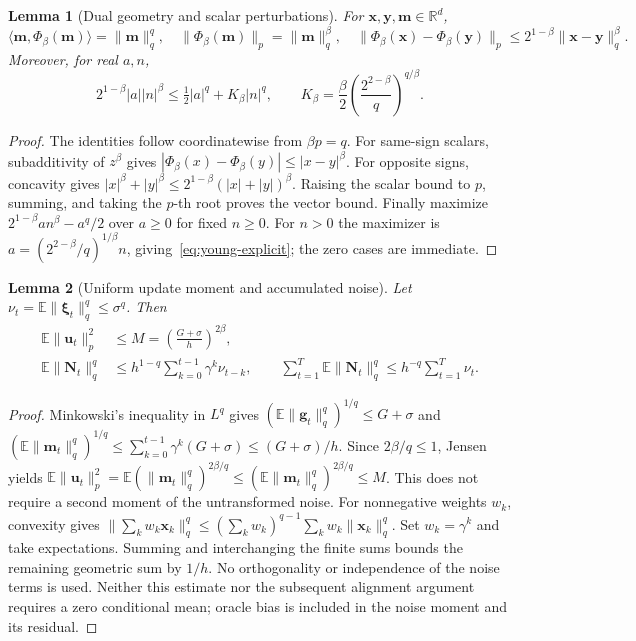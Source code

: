 \documentclass[10pt,a4paper]{amsart}
\newtheorem{lemma}{Lemma}
\begin{document}
\begin{lemma}[Dual geometry and scalar perturbations]\label{lemma:holder}
For $\mathbf{x},\mathbf{y},\mathbf{m}\in\mathbb R^d$,
\begin{equation}
\langle \mathbf{m},\Phi_\beta(\mathbf{m})\rangle=\|\mathbf{m}\|_q^q,\quad
\|\Phi_\beta(\mathbf{m})\|_p=\|\mathbf{m}\|_q^\beta,\quad
\|\Phi_\beta(\mathbf{x})-\Phi_\beta(\mathbf{y})\|_p\le2^{1-\beta}\|\mathbf{x}-\mathbf{y}\|_q^\beta.
\end{equation}
Moreover, for real $a,n$,
\begin{equation}\label{eq:young-explicit}
2^{1-\beta}|a||n|^\beta\le\tfrac12|a|^q+K_\beta|n|^q,
\qquad K_\beta=\frac\beta2\left(\frac{2^{2-\beta}}q\right)^{q/\beta}.
\end{equation}
\end{lemma}
\begin{proof}
The identities follow coordinatewise from $\beta p=q$. For same-sign scalars, subadditivity of $z^\beta$ gives $|\Phi_\beta(x)-\Phi_\beta(y)|\le|x-y|^\beta$. For opposite signs, concavity gives $|x|^\beta+|y|^\beta\le2^{1-\beta}(|x|+|y|)^\beta$. Raising the scalar bound to $p$, summing, and taking the $p$-th root proves the vector bound. Finally maximize $2^{1-\beta}a n^\beta-a^q/2$ over $a\ge0$ for fixed $n\ge0$. For $n>0$ the maximizer is $a=(2^{2-\beta}/q)^{1/\beta}n$, giving~\eqref{eq:young-explicit}; the zero cases are immediate.
\end{proof}

\begin{lemma}[Uniform update moment and accumulated noise]\label{lemma:momentum_bound}
Let $\nu_t=\mathbb E\|\bm{\xi}_t\|_q^q\le\sigma^q$. Then
\begin{align}
\mathbb E\|\mathbf{u}_t\|_p^2&\le M=\left(\frac{G+\sigma}{h}\right)^{2\beta},\label{eq:update-moment}\\
\mathbb E\|\mathbf{N}_t\|_q^q&\le h^{1-q}\sum_{k=0}^{t-1}\gamma^k\nu_{t-k},\qquad
\sum_{t=1}^T\mathbb E\|\mathbf{N}_t\|_q^q\le h^{-q}\sum_{t=1}^T\nu_t.\label{eq:noise-moment}
\end{align}
\end{lemma}
\begin{proof}
Minkowski's inequality in $L^q$ gives $(\mathbb E\|\mathbf{g}_t\|_q^q)^{1/q}\le G+\sigma$ and
$(\mathbb E\|\mathbf{m}_t\|_q^q)^{1/q}\le\sum_{k=0}^{t-1}\gamma^k(G+\sigma)\le(G+\sigma)/h$.
Since $2\beta/q\le1$, Jensen yields
$\mathbb E\|\mathbf{u}_t\|_p^2=\mathbb E(\|\mathbf{m}_t\|_q^q)^{2\beta/q}\le(\mathbb E\|\mathbf{m}_t\|_q^q)^{2\beta/q}\le M$.
This does not require a second moment of the untransformed noise.
For nonnegative weights $w_k$, convexity gives
$\|\sum_k w_k\mathbf{x}_k\|_q^q\le(\sum_k w_k)^{q-1}\sum_k w_k\|\mathbf{x}_k\|_q^q$.
Set $w_k=\gamma^k$ and take expectations. Summing and interchanging the finite sums bounds the remaining geometric sum by $1/h$. No orthogonality or independence of the noise terms is used. Neither this estimate nor the subsequent alignment argument requires a zero conditional mean; oracle bias is included in the noise moment and its residual.
\end{proof}
\end{document}
